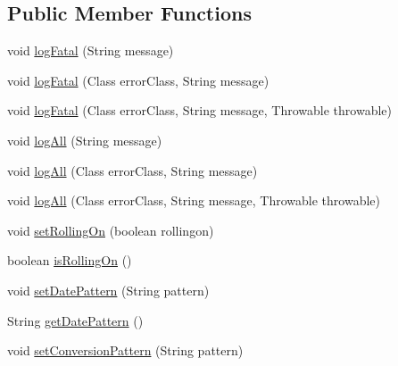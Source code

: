 \subsection*{Public Member Functions}
\begin{DoxyCompactItemize}
\item 
void \mbox{\hyperlink{interfacenet_1_1dlinkddns_1_1atulsaurabh_1_1hasselfreelogger_1_1api_1_1_logger_ae8fc6e4aeac87030546af120682aa178}{log\+Fatal}} (String message)
\item 
void \mbox{\hyperlink{interfacenet_1_1dlinkddns_1_1atulsaurabh_1_1hasselfreelogger_1_1api_1_1_logger_a05f87f45fe4302254060a2dac3429207}{log\+Fatal}} (Class error\+Class, String message)
\item 
void \mbox{\hyperlink{interfacenet_1_1dlinkddns_1_1atulsaurabh_1_1hasselfreelogger_1_1api_1_1_logger_a9ac7490ed937913b6dd97ee8898119bb}{log\+Fatal}} (Class error\+Class, String message, Throwable throwable)
\item 
void \mbox{\hyperlink{interfacenet_1_1dlinkddns_1_1atulsaurabh_1_1hasselfreelogger_1_1api_1_1_logger_a800f4847161a507a83b0d6731a01c210}{log\+All}} (String message)
\item 
void \mbox{\hyperlink{interfacenet_1_1dlinkddns_1_1atulsaurabh_1_1hasselfreelogger_1_1api_1_1_logger_ab5766fc9b8c0c78851d5ea90ade467b7}{log\+All}} (Class error\+Class, String message)
\item 
void \mbox{\hyperlink{interfacenet_1_1dlinkddns_1_1atulsaurabh_1_1hasselfreelogger_1_1api_1_1_logger_ad4c20aef678e51ab4822f5c301103f00}{log\+All}} (Class error\+Class, String message, Throwable throwable)
\item 
void \mbox{\hyperlink{interfacenet_1_1dlinkddns_1_1atulsaurabh_1_1hasselfreelogger_1_1api_1_1_logger_a2f15f4d94258528efb2938323deb8135}{set\+Rolling\+On}} (boolean rollingon)
\item 
boolean \mbox{\hyperlink{interfacenet_1_1dlinkddns_1_1atulsaurabh_1_1hasselfreelogger_1_1api_1_1_logger_a3815e1c6e6688af733cd8d098891c6da}{is\+Rolling\+On}} ()
\item 
void \mbox{\hyperlink{interfacenet_1_1dlinkddns_1_1atulsaurabh_1_1hasselfreelogger_1_1api_1_1_logger_a80727ab10655fa0ca0c5249ec3ed45b8}{set\+Date\+Pattern}} (String pattern)
\item 
String \mbox{\hyperlink{interfacenet_1_1dlinkddns_1_1atulsaurabh_1_1hasselfreelogger_1_1api_1_1_logger_ae0413346b180ceebfe7b522ed414a8ae}{get\+Date\+Pattern}} ()
\item 
void \mbox{\hyperlink{interfacenet_1_1dlinkddns_1_1atulsaurabh_1_1hasselfreelogger_1_1api_1_1_logger_a5a1b9dac86c15782309e01d5327e4299}{set\+Conversion\+Pattern}} (String pattern)

\end{DoxyCompactItemize}
